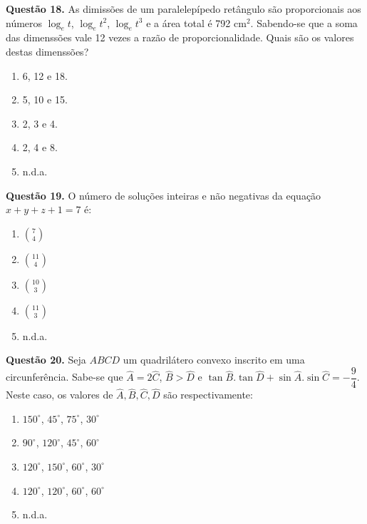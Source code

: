 \documentclass[11pt]{article}
\begin{document}
\textbf{Questão 18.} As dimissões de um paralelepípedo retângulo são proporcionais aos números $\log_e t$, $\log_e t^2$, $\log_e t^3$ e a área total é 792 cm$^2$. Sabendo-se que a soma das dimenssões vale 12 vezes a razão de proporcionalidade. Quais são os valores destas dimenssões?

\begin{multicols}{5}
    \begin{enumerate}[\bf A (\quad)]
        \item 6, 12 e 18.
        \item 5, 10 e 15.
        \item 2, 3 e 4.
        \item 2, 4 e 8.
        \item n.d.a.
    \end{enumerate}
\end{multicols}

\textbf{Questão 19.} O número de soluções inteiras e não negativas da equação $x + y + z + 1 = 7 $ é:

\begin{multicols}{5}
    \begin{enumerate}[\bf A (\quad)]
        \item $\displaystyle \binom{7}{4}$
        \item $\displaystyle \binom{11}{4}$
        \item $\displaystyle \binom{10}{3}$
        \item $\displaystyle \binom{11}{3}$
        \item n.d.a.
    \end{enumerate}
\end{multicols}

\textbf{Questão 20.} Seja $ABCD$ um quadrilátero convexo inscrito em uma circunferência. Sabe-se que $\hat{A} = 2\hat{C}$, $\hat{B} > \hat{D}$ e $\tan \hat{B}.\tan \hat{D} + \sin \hat{A}. \sin \hat{C} = -\dfrac{9}{4}$. Neste caso, os valores de $\hat{A}, \hat{B}, \hat{C}, \hat{D}$ são respectivamente:

\begin{multicols}{3}
    \begin{enumerate}[\bf A (\quad)]
        \item $150^{\circ}$, $45^{\circ}$, $75^{\circ}$, $30^{\circ}$
        \item $90^{\circ}$, $120^{\circ}$, $45^{\circ}$, $60^{\circ}$
        \item $120^{\circ}$, $150^{\circ}$, $60^{\circ}$, $30^{\circ}$
        \item $120^{\circ}$, $120^{\circ}$, $60^{\circ}$, $60^{\circ}$
        \item n.d.a.
    \end{enumerate}
\end{multicols}
\end{document}
